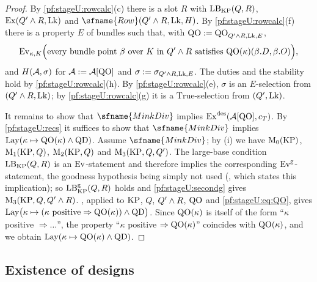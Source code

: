 \begin{proof}
By \cref{pf:stageU:rowcalc}(c) there is a slot $R$ with $\mathrm{LB}_{\mathrm{KP}}(Q,R)$, $\mathrm{Ex}(Q'\mathbin{\wedge} R,\mathrm{Lk})$ and
$\sfname{Row}(Q'\stageUand R,\stageULk,H)$. By \cref{pf:stageU:rowcalc}(f) there is a property $E$ of bundles such that,
with $\mathrm{QO}:=\mathrm{QO}_{Q'\mathbin{\wedge} R,\mathrm{Lk},E}$,
\begin{equation}\label{pf:stageU:eq:QO}
\mathrm{Ev}_{\kappa,K}\Bigl(\text{every bundle point }\beta\text{ over }K\text{ in }Q'\mathbin{\wedge} R\text{ satisfies }
\mathrm{QO}(\kappa)(\beta.D,\beta.O)\Bigr),
\end{equation}
and $H(\mathcal{A},\sigma)$ for $\mathcal{A}:=\mathcal{A}[\mathrm{QO}]$ and $\sigma:=\sigma_{Q'\mathbin{\wedge} R,\mathrm{Lk},E}$. The duties and the
stability hold by \cref{pf:stageU:rowcalc}(h). By \cref{pf:stageU:rowcalc}(e), $\sigma$ is an $E$-selection from
$(Q'\mathbin{\wedge} R,\mathrm{Lk})$; by \cref{pf:stageU:rowcalc}(g) it is a $\mathrm{True}$-selection from $(Q',\mathrm{Lk})$.

It remains to show that $\sfname{MinkDiv}$ implies $\mathrm{Ex}^{\mathrm{des}}(\mathcal{A}[\mathrm{QO}],c_T)$. By \cref{pf:stageU:recs}
it suffices to show that $\sfname{MinkDiv}$ implies $\mathrm{Lay}(\kappa\mapsto\mathrm{QO}(\kappa)\wedge\mathrm{QD})$. Assume
$\sfname{MinkDiv}$; by (i) we have $\mathrm{M}_0(\mathrm{KP})$, $\mathrm{M}_1(\mathrm{KP},Q)$, $\mathrm{M}_2(\mathrm{KP},Q)$ and
$\mathrm{M}_3(\mathrm{KP},Q,Q')$. The large-base condition $\mathrm{LB}_{\mathrm{KP}}(Q,R)$ is an $\mathrm{Ev}$-statement and therefore
implies the corresponding $\mathrm{Ev}^{\mathrm g}$-statement, the goodness hypothesis being simply not used
(, which states this implication); so $\mathrm{LB}^{\mathrm g}_{\mathrm{KP}}(Q,R)$ holds and
\cref{pf:stageU:secondg} gives $\mathrm{M}_3(\mathrm{KP},Q,Q'\mathbin{\wedge} R)$. , applied to $\mathrm{KP}$,
$Q$, $Q'\mathbin{\wedge} R$, $\mathrm{QO}$ and \eqref{pf:stageU:eq:QO}, gives
$\mathrm{Lay}\bigl(\kappa\mapsto(\kappa\text{ positive}\Rightarrow\mathrm{QO}(\kappa))\wedge\mathrm{QD}\bigr)$. Since
$\mathrm{QO}(\kappa)$ is itself of the form ``$\kappa$ positive $\Rightarrow\dots$'', the property
``$\kappa$ positive $\Rightarrow\mathrm{QO}(\kappa)$'' coincides with $\mathrm{QO}(\kappa)$, and we obtain
$\mathrm{Lay}(\kappa\mapsto\mathrm{QO}(\kappa)\wedge\mathrm{QD})$.
\end{proof}

\subsection{Existence of designs}\label{sec:pf:stageU:designs}

